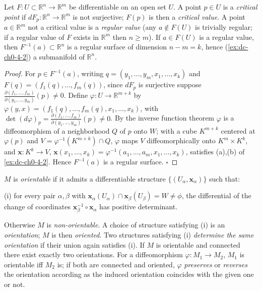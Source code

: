\begin{example}
  \label{ex:dc-ch0-4-3}
  \notready
  Let $F:U\subset\mathbb{R}^n\to\mathbb{R}^m$ be differentiable on an open set $U$.
  A point $p\in U$ is a \emph{critical point} if $dF_p:\mathbb{R}^n\to\mathbb{R}^m$ is
  not surjective; $F(p)$ is then a \emph{critical value}. A point $a\in\mathbb{R}^m$ not
  a critical value is a \emph{regular value} (any $a\notin F(U)$ is trivially regular; if
  a regular value of $F$ exists in $\mathbb{R}^m$ then $n\ge m$). If $a\in F(U)$ is
  a regular value, then $F^{-1}(a)\subset\mathbb{R}^n$ is a regular surface of
  dimension $n-m=k$, hence (\cref{ex:dc-ch0-4-2}) a submanifold of $\mathbb{R}^n$.
\end{example}
\begin{proof}
  \sketch
  For $p\in F^{-1}(a)$, writing $q=(y_1,\dots,y_m,x_1,\dots,x_k)$ and
  $F(q)=(f_1(q),\dots,f_m(q))$, since $dF_p$ is surjective suppose
  $\frac{\partial(f_1,\dots,f_m)}{\partial(y_1,\dots,y_m)}(p)\neq0$. Define
  $\varphi:U\to\mathbb{R}^{m+k}$ by
  $\varphi(y,x)=(f_1(q),\dots,f_m(q),x_1,\dots,x_k)$, with
  $\det(d\varphi)_p=\frac{\partial(f_1,\dots,f_m)}{\partial(y_1,\dots,y_m)}(p)\neq0$.
  By the inverse function theorem $\varphi$ is a diffeomorphism of a neighborhood
  $Q$ of $p$ onto $W$; with a cube $K^{m+k}$ centered at $\varphi(p)$ and
  $V=\varphi^{-1}(K^{m+k})\cap Q$, $\varphi$ maps $V$ diffeomorphically onto
  $K^m\times K^k$, and $\mathbf{x}:K^k\to V$,
  $\mathbf{x}(x_1,\dots,x_k)=\varphi^{-1}(a_1,\dots,a_m,x_1,\dots,x_k)$, satisfies
  (a),(b) of \cref{ex:dc-ch0-4-2}. Hence $F^{-1}(a)$ is a regular surface. $\square$
\end{proof}

\begin{definition}
  \label{def:dc-ch0-4-4}
  \leanok
  $M$ is \emph{orientable} if it admits a differentiable structure
  $\{(U_\alpha,\mathbf{x}_\alpha)\}$ such that:
  
  (i) for every pair $\alpha,\beta$ with
  $\mathbf{x}_\alpha(U_\alpha)\cap\mathbf{x}_\beta(U_\beta)=W\neq\phi$, the
  differential of the change of coordinates
  $\mathbf{x}_\beta^{-1}\circ\mathbf{x}_\alpha$ has positive determinant.
  
  Otherwise $M$ is \emph{non-orientable}. A choice of structure satisfying (i) is an
  \emph{orientation}; $M$ is then \emph{oriented}. Two structures satisfying (i) \emph{determine
  the same orientation} if their union again satisfies (i). If $M$ is orientable and
  connected there exist exactly two orientations. For a diffeomorphism
  $\varphi:M_1\to M_2$, $M_1$ is orientable iff $M_2$ is; if both are connected and
  oriented, $\varphi$ \emph{preserves} or \emph{reverses} the orientation according as the
  induced orientation coincides with the given one or not.
\end{definition}

